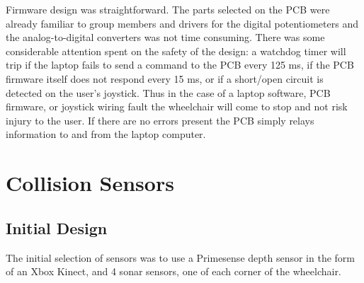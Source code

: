 \documentclass[oneside,final,a4paper]{report}
\begin{document}
Firmware design was straightforward. The parts selected on the PCB were already familiar to group members and drivers for the digital potentiometers and the analog-to-digital converters was not time consuming. There was some considerable attention spent on the safety of the design: a watchdog timer will trip if the laptop fails to send a command to the PCB every 125 ms, if the PCB firmware itself does not respond every 15 ms, or if a short/open circuit is detected on the user's joystick. Thus in the case of a laptop software, PCB firmware, or joystick wiring fault the wheelchair will come to stop and not risk injury to the user. If there are no errors present the PCB simply relays information to and from the laptop computer.


\chapter{Collision Sensors}

\section{Initial Design}
The initial selection of sensors was to use a Primesense depth sensor in the form of an Xbox Kinect, and 4 sonar sensors, one of each corner of the wheelchair.
\end{document}
